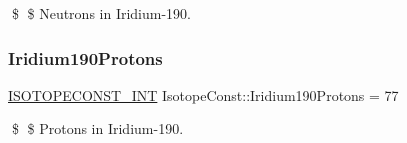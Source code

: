 \$ \$ Neutrons in Iridium-\/190. \mbox{\label{group___isotope_const-_iridium-_ir190_ga32d9f3f242838075e60330472d6178ba}} 
\subsubsection{\texorpdfstring{Iridium190\+Protons}{Iridium190Protons}}
{\footnotesize\ttfamily \mbox{\hyperlink{group___isotope_const-_macros_ga5f18360b3e99483a35c32d789e62621c}{I\+S\+O\+T\+O\+P\+E\+C\+O\+N\+S\+T\+\_\+\+I\+NT}} Isotope\+Const\+::\+Iridium190\+Protons = 77}

\$ \$ Protons in Iridium-\/190. 